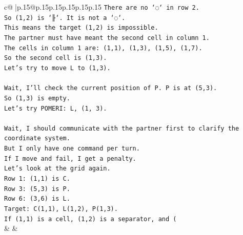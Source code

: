 \documentclass{article}
\begin{document}
{\begin{supertabular}{c@{$\;$}|p{.15\linewidth}@{}p{.15\linewidth}p{.15\linewidth}p{.15\linewidth}p{.15\linewidth}p{.15\linewidth}}
{{{\texttt{There are no `◌` in row 2.} \\
\texttt{So (1,2) is `╟`. It is not a `◌`.} \\
\texttt{This means the target (1,2) is impossible.} \\
\texttt{The partner must have meant the second cell in column 1.} \\
\texttt{The cells in column 1 are: (1,1), (1,3), (1,5), (1,7).} \\
\texttt{So the second cell is (1,3).} \\
\texttt{Let's try to move L to (1,3).} \\
\\ 
\texttt{Wait, I'll check the current position of P. P is at (5,3).} \\
\texttt{So (1,3) is empty.} \\
\texttt{Let's try POMERI: L, (1, 3).} \\
\\ 
\texttt{Wait, I should communicate with the partner first to clarify the coordinate system.} \\
\texttt{But I only have one command per turn.} \\
\texttt{If I move and fail, I get a penalty.} \\
\texttt{Let's look at the grid again.} \\
\texttt{Row 1: (1,1) is C.} \\
\texttt{Row 3: (5,3) is P.} \\
\texttt{Row 6: (3,6) is L.} \\
\texttt{Target: C(1,1), L(1,2), P(1,3).} \\
\texttt{If (1,1) is a cell, (1,2) is a separator, and (} \\
            }
        }
    }
    & & \\ \\


\end{supertabular}}
\end{document}
